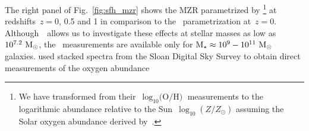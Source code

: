 \documentclass[foo.tex]{subfiles}
\begin{document}
\par
The right panel of Fig.~\ref{fig:sfh_mzr} shows the MZR parametrized by
\citet[][see their equation 5]{Zahid2014}\footnote{
	We have transformed from their~$\log_{10}\text{(O/H)}$ measurements to the
	logarithmic abundance relative to the Sun~$\log_{10}(Z / Z_\odot)$ assuming
	the Solar oxygen abundance derived by~\citet{Asplund2009}.
} at redshifts~$z = 0$, 0.5 and 1 in comparison to the~\citet{Andrews2013}
parametrization at~$z = 0$.
Although~\um~allows us to investigate these effects at stellar masses as low as
$10^{7.2}~\text{M}_\odot$, the~\citet{Zahid2014} measurements are available only for
$\text{M}_\star \approx 10^9 - 10^{11}~\text{M}_\odot$ galaxies.
\citet{Andrews2013} used stacked spectra from the Sloan Digital Sky Survey
\citep[SDSS;][]{York2000} to obtain direct measurements of the oxygen abundance
\end{document}
